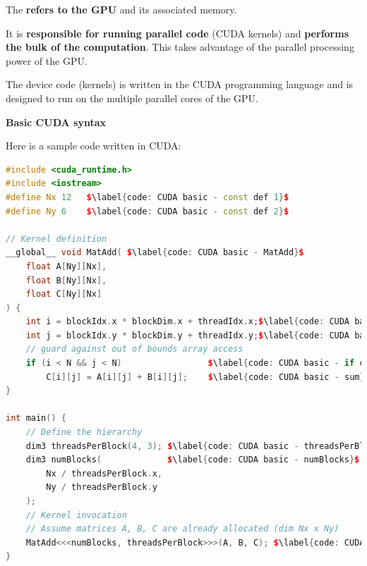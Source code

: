 \begin{definitionbox}
    The  \textbf{refers to the GPU} and its associated memory.

    It is \textbf{responsible for running parallel code} (CUDA kernels) and \textbf{performs the bulk of the computation}. This takes advantage of the parallel processing power of the GPU.
    
    The device code (kernels) is written in the CUDA programming language and is designed to run on the multiple parallel cores of the GPU.
\end{definitionbox}

\begin{flushleft}
    \textcolor{Green3}{ \textbf{Basic CUDA syntax}}
\end{flushleft}
Here is a sample code written in CUDA:
\begin{lstlisting}[language=C++]
#include <cuda_runtime.h>
#include <iostream>
#define Nx 12   $\label{code: CUDA basic - const def 1}$
#define Ny 6    $\label{code: CUDA basic - const def 2}$

// Kernel definition
__global__ void MatAdd( $\label{code: CUDA basic - MatAdd}$
    float A[Ny][Nx], 
    float B[Ny][Nx], 
    float C[Ny][Nx]
) {
    int i = blockIdx.x * blockDim.x + threadIdx.x;$\label{code: CUDA basic - index i}$
    int j = blockIdx.y * blockDim.y + threadIdx.y;$\label{code: CUDA basic - index j}$
    // guard against out of bounds array access
    if (i < N && j < N)                 $\label{code: CUDA basic - if condition}$
        C[i][j] = A[i][j] + B[i][j];    $\label{code: CUDA basic - sum}$
}

int main() {
    // Define the hierarchy
    dim3 threadsPerBlock(4, 3); $\label{code: CUDA basic - threadsPerBlock}$
    dim3 numBlocks(             $\label{code: CUDA basic - numBlocks}$
        Nx / threadsPerBlock.x, 
        Ny / threadsPerBlock.y
    );
    // Kernel invocation
    // Assume matrices A, B, C are already allocated (dim Nx x Ny)
    MatAdd<<<numBlocks, threadsPerBlock>>>(A, B, C); $\label{code: CUDA basic - MatAdd invocation}$
}
\end{lstlisting}
